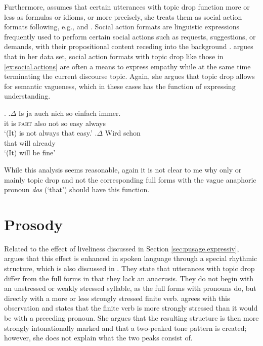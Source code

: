 Furthermore, \citet[177]{helmer2016} assumes that certain utterances with topic drop function more or less as formulas or idioms, or more precisely, she treats them as social action formats following, e.g., \citet{thompson.couper-kuhlen2005} and \citet{fox2007}.
Social action formats are linguistic expressions frequently used to perform certain social actions such as requests, suggestions, or demands, with their propositional content receding into the background \citep[see also][]{deppermann2021}.
\citet[177]{helmer2016} argues that in her data set, social action formats with topic drop like those in \ref{ex:social.actions} are often a means to express empathy while at the same time terminating the current discourse topic. 
Again, she argues that topic drop allows for semantic vagueness, which in these cases has the function of expressing understanding.

\ex.\label{ex:social.actions}
\ag.$\Delta$ Is ja auch nich so einfach immer.\\
it is \textsc{part} also not so easy always\\
`(It) is not always that easy.' \citep[178, shortened and simplified]{helmer2016}
\bg.$\Delta$ Wird schon\\
that will already\\
`(It) will be fine' \citep[179, shortened and simplified]{helmer2016}

While this analysis seems reasonable, again it is not clear to me why only or mainly topic drop and not the corresponding full forms with the vague anaphoric pronoun \textit{das} (`that') should have this function.

\section{Prosody}\label{sec:pusage.prosody}
Related to the effect of liveliness discussed in Section \ref{sec:pusage.expressiv}, \citet[218]{auer1993} argues that this effect is enhanced in spoken language through a special rhythmic structure, which is also discussed in \citet[104]{guenthner2006}.
They state that utterances with topic drop differ from the full forms in that they lack an anacrusis.
They do not begin with an unstressed or weakly stressed syllable, as the full forms with pronouns do, but directly with a more or less strongly stressed finite verb.
\citet[300]{sandig2000} agrees with this observation and states that the finite verb is more strongly stressed than it would be with a preceding pronoun.
She argues that the resulting structure is then more strongly intonationally marked and that a two-peaked tone pattern is created; however, she does not explain what the two peaks consist of. 

